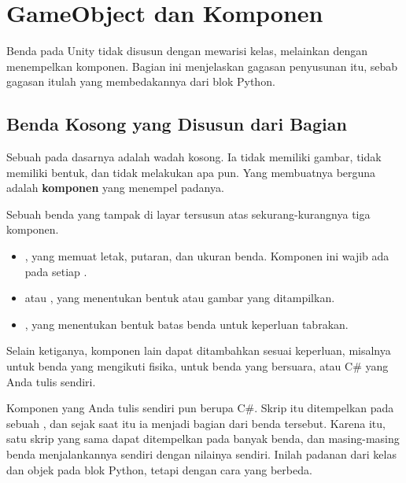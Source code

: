 \section{GameObject dan Komponen}
\label{sec:gameobject}

Benda pada Unity tidak disusun dengan mewarisi kelas, melainkan dengan
menempelkan komponen. Bagian ini menjelaskan gagasan penyusunan itu, sebab
gagasan itulah yang membedakannya dari blok Python.

\subsection{Benda Kosong yang Disusun dari Bagian}

Sebuah  pada dasarnya adalah wadah kosong. Ia tidak
memiliki gambar, tidak memiliki bentuk, dan tidak melakukan apa pun. Yang
membuatnya berguna adalah \textbf{komponen} yang menempel padanya.

Sebuah benda yang tampak di layar tersusun atas sekurang-kurangnya tiga
komponen.

\begin{itemize}
  \item {}, yang memuat letak, putaran, dan ukuran benda.
        Komponen ini wajib ada pada setiap .
  \item {} atau , yang menentukan
        bentuk atau gambar yang ditampilkan.
  \item {}, yang menentukan bentuk batas benda untuk keperluan
        tabrakan.
\end{itemize}

Selain ketiganya, komponen lain dapat ditambahkan sesuai keperluan, misalnya
 untuk benda yang mengikuti fisika, 
untuk benda yang bersuara, atau  C\# yang Anda tulis sendiri.

\begin{catatabox}
Komponen yang Anda tulis sendiri pun berupa  C\#.
Skrip itu ditempelkan pada sebuah , dan sejak saat itu ia
menjadi bagian dari benda tersebut. Karena itu, satu skrip yang sama dapat
ditempelkan pada banyak benda, dan masing-masing benda menjalankannya sendiri
dengan nilainya sendiri. Inilah padanan dari kelas dan objek pada blok Python,
tetapi dengan cara yang berbeda.
\end{catatabox}


